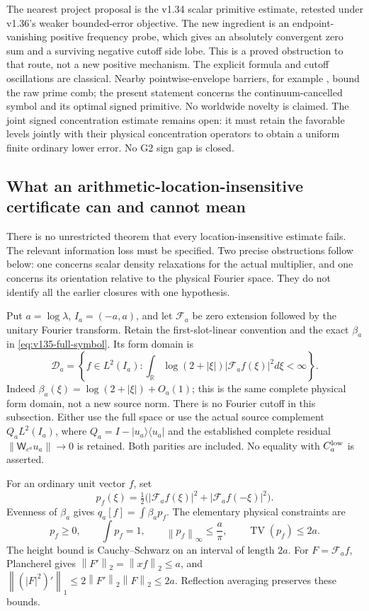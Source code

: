 \documentclass[11pt]{article}
\theoremstyle{remark}
\newcommand{\norm}[1]{\left\lVert #1\right\rVert}
\begin{document}
The nearest project proposal is the v1.34 scalar primitive estimate,
retested under v1.36's weaker bounded-error objective. The new ingredient
is an endpoint-vanishing positive frequency probe, which gives an
absolutely convergent zero sum and a surviving negative cutoff side lobe.
This is a proved obstruction to that route, not a new positive mechanism.
The explicit formula and cutoff oscillations are classical. Nearby
pointwise-envelope barriers, for example \cite{Zhu2026}, bound the raw
prime comb; the present statement concerns the continuum-cancelled
symbol and its optimal signed primitive. No worldwide novelty is claimed.
The joint signed concentration estimate remains open: it must retain
the favorable levels jointly with their physical concentration operators
to obtain a uniform finite ordinary lower error. No G2 sign gap is closed.


\subsection*{What an arithmetic-location-insensitive certificate can and cannot mean}

There is no unrestricted theorem that every location-insensitive estimate
fails. The relevant information loss must be specified. Two precise
obstructions follow below: one concerns scalar density relaxations for
the actual multiplier, and one concerns its orientation relative to the
physical Fourier space. They do not identify all the earlier closures
with one hypothesis.

Put $a=\log\lambda$, $I_a=(-a,a)$, and let $\mathcal F_a$ be zero
extension followed by the unitary Fourier transform. Retain the
first-slot-linear convention and the exact $\beta_a$ in
\eqref{eq:v135-full-symbol}. Its form domain is
\[
 \mathcal D_a=\left\{f\in L^2(I_a):
 \int_{\mathbb R}\log(2+|\xi|)|\mathcal F_af(\xi)|^2d\xi<\infty\right\}.
\]
Indeed $\beta_a(\xi)=\log(2+|\xi|)+O_a(1)$; this is the same
complete physical form domain, not a new source norm. There is no
Fourier cutoff in this subsection. Either use the full space or use
the actual source complement $Q_aL^2(I_a)$, where
$Q_a=I-|u_a\rangle\langle u_a|$ and the established complete
residual $\norm{\mathsf W_{e^a}u_a}\to0$ is retained. Both parities
are included. No equality with $C_a^{\rm low}$ is asserted.

For an ordinary unit vector $f$, set
\[
 p_f(\xi)=\tfrac12\bigl(|\mathcal F_af(\xi)|^2+
                               |\mathcal F_af(-\xi)|^2\bigr).
\]
Evenness of $\beta_a$ gives $q_a[f]=\int\beta_ap_f$. The elementary
physical constraints are
\begin{equation}\label{eq:v139-density-constraints}
 p_f\ge0,\qquad \int p_f=1,\qquad
 \norm{p_f}_\infty\le\frac a\pi,\qquad
 \operatorname{TV}(p_f)\le2a.
\end{equation}
The height bound is Cauchy--Schwarz on an interval of length $2a$.
For $F=\mathcal F_af$, Plancherel gives
$\norm{F'}_2=\norm{xf}_2\le a$, and
$\norm{(|F|^2)'}_1\le2\norm{F'}_2\norm F_2\le2a$.
Reflection averaging preserves these bounds.
\end{document}
